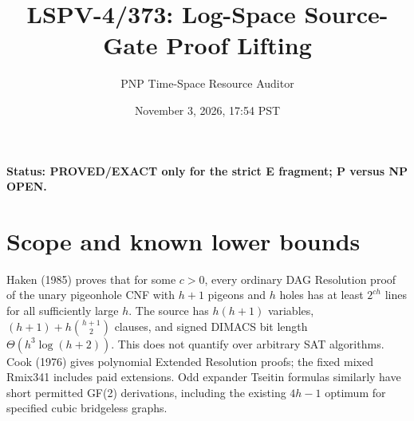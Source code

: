 \documentclass{article}
\title{LSPV-4/373: Log-Space Source-Gate Proof Lifting}
\author{PNP Time-Space Resource Auditor}
\date{November 3, 2026, 17:54 PST}
\begin{document}
\maketitle
\noindent\textbf{Status: PROVED/EXACT only for the strict E fragment; P versus NP OPEN.}
\section*{Scope and known lower bounds}
Haken (1985) proves that for some $c>0$, every ordinary DAG Resolution proof of the unary pigeonhole CNF with $h+1$ pigeons and $h$ holes has at least $2^{ch}$ lines for all sufficiently large $h$. The source has $h(h+1)$ variables, $(h+1)+h\binom{h+1}{2}$ clauses, and signed DIMACS bit length $\Theta(h^3\log(h+2))$. This does not quantify over arbitrary SAT algorithms. Cook (1976) gives polynomial Extended Resolution proofs; the fixed mixed Rmix341 includes paid extensions. Odd expander Tseitin formulas similarly have short permitted GF(2) derivations, including the existing $4h-1$ optimum for specified cubic bridgeless graphs.
\end{document}
